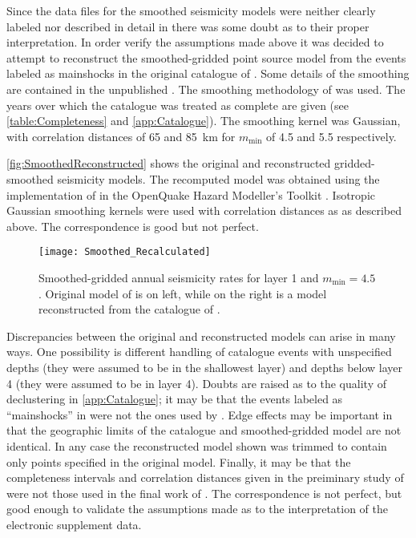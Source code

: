 \documentclass{article}
\begin{document}
Since the data files for the smoothed seismicity models were neither clearly labeled nor described in detail in \cite{nath2012probabilistic} there was some doubt as to their proper interpretation. 
In order verify the assumptions made above it was decided to attempt to reconstruct the smoothed-gridded point source model from the events labeled as mainshocks in the original catalogue of \cite{nath2010earthquake}.
Some details of the smoothing are contained in the unpublished \cite{thingbaijam2011seismogenic}.
The smoothing methodology of \citet{frankel1995mapping} was used.
The years over which the catalogue was treated as complete are given (see \autoref{table:Completeness} and \autoref{app:Catalogue}). 
The smoothing kernel was Gaussian, with correlation distances of 65 and 85~km for $m_\text{min}$ of 4.5 and 5.5 respectively.

\autoref{fig:SmoothedReconstructed} shows the original and reconstructed gridded-smoothed seismicity models. 
The recomputed model was obtained using the implementation of \citet{frankel1995mapping} in the OpenQuake Hazard Modeller’s Toolkit \citep{weatherill2014openquake}.
Isotropic Gaussian smoothing kernels were used with correlation distances as as described above.
The correspondence is good but not perfect.

\begin{figure}
\begin{adjustbox}{center}
\texttt{[image: Smoothed\_Recalculated]}
\end{adjustbox}
\caption[Original and reconstructed smoothed-gridded seismicity models]{%
Smoothed-gridded annual seismicity rates for layer 1 and $m_\text{min} = 4.5$. 
Original model of  \citet{nath2012probabilistic} is on left, while on the right is a model reconstructed from the catalogue of \cite{nath2010earthquake}.}
\label{fig:SmoothedReconstructed}
\end{figure}

Discrepancies between the original and reconstructed models can arise in many ways.
One possibility is different handling of catalogue events with unspecified depths (they were assumed to be in the shallowest layer) and depths below layer 4 (they were assumed to be in layer 4).
Doubts are raised as to the quality of declustering in \autoref{app:Catalogue}; it may be that the events labeled as ``mainshocks'' in \cite{nath2010earthquake} were not the ones used by \cite{thingbaijam2011seismogenic}.
Edge effects may be important in that the geographic limits of the catalogue and smoothed-gridded model are not identical.
In any case the reconstructed model shown was trimmed to contain only points specified in the original model.
Finally, it may be that the completeness intervals and correlation distances given in the preiminary study of \cite{thingbaijam2011seismogenic} were not those used in the final work of \cite{nath2012probabilistic}.
The correspondence is not perfect, but good enough to validate the assumptions made as to the interpretation of the electronic supplement data.
\end{document}
